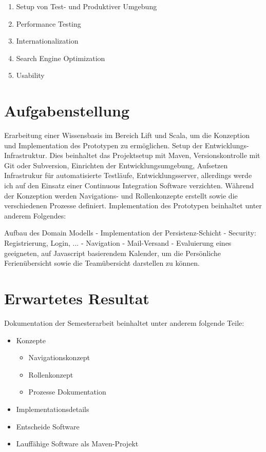 \begin{enumerate}
	\item Setup von Test- und Produktiver Umgebung
	\item Performance Testing
	\item Internationalization 
	\item Search Engine Optimization
	\item Usability
\end{enumerate}

\section{Aufgabenstellung}
Erarbeitung einer Wissensbasis im Bereich Lift und Scala, um die Konzeption und Implementation des Prototypen zu erm\"oglichen. Setup der Entwicklungs-Infrastruktur. Dies beinhaltet das Projektsetup mit Maven, Versionskontrolle mit Git oder Subversion, Einrichten der Entwicklungsumgebung, Aufsetzen Infrastrukur f\"ur automatisierte Testl\"aufe, Entwicklungsserver, allerdings werde ich auf den Einsatz einer Continuous Integration Software verzichten. W\"ahrend der Konzeption werden Navigations- und Rollenkonzepte erstellt sowie die verschiedenen Prozesse definiert. Implementation des Prototypen beinhaltet unter anderem Folgendes:

Aufbau des Domain Modells - Implementation der Persistenz-Schicht - Security: Registrierung, Login, ... - Navigation - Mail-Versand - Evaluierung eines geeigneten, auf Javascript basierendem Kalender, um die Pers\"onliche Ferien\"ubersicht sowie die Team\"ubersicht darstellen zu k\"onnen.

\section{Erwartetes Resultat}
Dokumentation der Semesterarbeit beinhaltet unter anderem folgende Teile: 
\begin{itemize}
\item Konzepte
	\begin{itemize}
		\item Navigationskonzept
		\item Rollenkonzept
		\item Prozesse Dokumentation
	\end{itemize}	
	\item Implementationsdetails
	\item Entscheide Software
	\item Lauff\"ahige Software als Maven-Projekt
\end{itemize}



